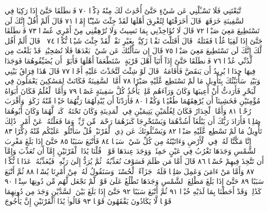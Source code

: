 ٱتَّبَعْتَنِي فَلَا تَسْـَٔلْنِي عَن شَيْءٍ حَتَّىٰٓ أُحْدِثَ لَكَ مِنْهُ ذِكْرࣰا ٧٠
فَٱنطَلَقَا حَتَّىٰٓ إِذَا رَكِبَا فِي ٱلسَّفِينَةِ خَرَقَهَاۖ قَالَ أَخَرَقْتَهَا
لِتُغْرِقَ أَهْلَهَا لَقَدْ جِئْتَ شَيْـًٔا إِمْرࣰا ٧١ قَالَ أَلَمْ أَقُلْ إِنَّكَ
لَن تَسْتَطِيعَ مَعِيَ صَبْرࣰا ٧٢ قَالَ لَا تُؤَاخِذْنِي بِمَا نَسِيتُ وَلَا
تُرْهِقْنِي مِنْ أَمْرِي عُسْرࣰا ٧٣ فَٱنطَلَقَا حَتَّىٰٓ إِذَا لَقِيَا غُلَٰمࣰا فَقَتَلَهُۥ
قَالَ أَقَتَلْتَ نَفْسࣰا زَكِيَّةَۢ بِغَيْرِ نَفْسࣲ لَّقَدْ جِئْتَ شَيْـࣰٔا نُّكْرࣰا ٧٤
۞ قَالَ أَلَمْ أَقُل لَّكَ إِنَّكَ لَن تَسْتَطِيعَ مَعِيَ صَبْرࣰا ٧٥ قَالَ إِن
سَأَلْتُكَ عَن شَيْءِۭ بَعْدَهَا فَلَا تُصَٰحِبْنِيۖ قَدْ بَلَغْتَ مِن لَّدُنِّي
عُذْرࣰا ٧٦ فَٱنطَلَقَا حَتَّىٰٓ إِذَآ أَتَيَآ أَهْلَ قَرْيَةٍ ٱسْتَطْعَمَآ أَهْلَهَا فَأَبَوْا۟
أَن يُضَيِّفُوهُمَا فَوَجَدَا فِيهَا جِدَارࣰا يُرِيدُ أَن يَنقَضَّ فَأَقَامَهُۥۖ
قَالَ لَوْ شِئْتَ لَتَّخَذْتَ عَلَيْهِ أَجْرࣰا ٧٧ قَالَ هَٰذَا فِرَاقُ بَيْنِي
وَبَيْنِكَۚ سَأُنَبِّئُكَ بِتَأْوِيلِ مَا لَمْ تَسْتَطِع عَّلَيْهِ صَبْرًا ٧٨ أَمَّا
ٱلسَّفِينَةُ فَكَانَتْ لِمَسَٰكِينَ يَعْمَلُونَ فِي ٱلْبَحْرِ فَأَرَدتُّ أَنْ
أَعِيبَهَا وَكَانَ وَرَآءَهُم مَّلِكࣱ يَأْخُذُ كُلَّ سَفِينَةٍ غَصْبࣰا ٧٩ وَأَمَّا
ٱلْغُلَٰمُ فَكَانَ أَبَوَاهُ مُؤْمِنَيْنِ فَخَشِينَآ أَن يُرْهِقَهُمَا طُغْيَٰنࣰا
وَكُفْرࣰا ٨٠ فَأَرَدْنَآ أَن يُبْدِلَهُمَا رَبُّهُمَا خَيْرࣰا مِّنْهُ زَكَوٰةࣰ وَأَقْرَبَ
رُحْمࣰا ٨١ وَأَمَّا ٱلْجِدَارُ فَكَانَ لِغُلَٰمَيْنِ يَتِيمَيْنِ فِي ٱلْمَدِينَةِ
وَكَانَ تَحْتَهُۥ كَنزࣱ لَّهُمَا وَكَانَ أَبُوهُمَا صَٰلِحࣰا فَأَرَادَ رَبُّكَ أَن
يَبْلُغَآ أَشُدَّهُمَا وَيَسْتَخْرِجَا كَنزَهُمَا رَحْمَةࣰ مِّن رَّبِّكَۚ
وَمَا فَعَلْتُهُۥ عَنْ أَمْرِيۚ ذَٰلِكَ تَأْوِيلُ مَا لَمْ تَسْطِع عَّلَيْهِ صَبْرࣰا ٨٢
وَيَسْـَٔلُونَكَ عَن ذِي ٱلْقَرْنَيْنِۖ قُلْ سَأَتْلُوا۟ عَلَيْكُم مِّنْهُ ذِكْرًا ٨٣
إِنَّا مَكَّنَّا لَهُۥ فِي ٱلْأَرْضِ وَءَاتَيْنَٰهُ مِن كُلِّ شَيْءࣲ سَبَبࣰا ٨٤ فَأَتْبَعَ
سَبَبًا ٨٥ حَتَّىٰٓ إِذَا بَلَغَ مَغْرِبَ ٱلشَّمْسِ وَجَدَهَا تَغْرُبُ فِي عَيْنٍ حَمِئَةࣲ
وَوَجَدَ عِندَهَا قَوْمࣰاۖ قُلْنَا يَٰذَا ٱلْقَرْنَيْنِ إِمَّآ أَن تُعَذِّبَ وَإِمَّآ أَن تَتَّخِذَ
فِيهِمْ حُسْنࣰا ٨٦ قَالَ أَمَّا مَن ظَلَمَ فَسَوْفَ نُعَذِّبُهُۥ ثُمَّ يُرَدُّ إِلَىٰ رَبِّهِۦ
فَيُعَذِّبُهُۥ عَذَابࣰا نُّكْرࣰا ٨٧ وَأَمَّا مَنْ ءَامَنَ وَعَمِلَ صَٰلِحࣰا فَلَهُۥ جَزَآءً
ٱلْحُسْنَىٰۖ وَسَنَقُولُ لَهُۥ مِنْ أَمْرِنَا يُسْرࣰا ٨٨ ثُمَّ أَتْبَعَ سَبَبًا ٨٩ حَتَّىٰٓ
إِذَا بَلَغَ مَطْلِعَ ٱلشَّمْسِ وَجَدَهَا تَطْلُعُ عَلَىٰ قَوْمࣲ لَّمْ نَجْعَل لَّهُم مِّن
دُونِهَا سِتْرࣰا ٩٠ كَذَٰلِكَۖ وَقَدْ أَحَطْنَا بِمَا لَدَيْهِ خُبْرࣰا ٩١ ثُمَّ
أَتْبَعَ سَبَبًا ٩٢ حَتَّىٰٓ إِذَا بَلَغَ بَيْنَ ٱلسَّدَّيْنِ وَجَدَ مِن دُونِهِمَا قَوْمࣰا
لَّا يَكَادُونَ يَفْقَهُونَ قَوْلࣰا ٩٣ قَالُوا۟ يَٰذَا ٱلْقَرْنَيْنِ إِنَّ يَأْجُوجَ
